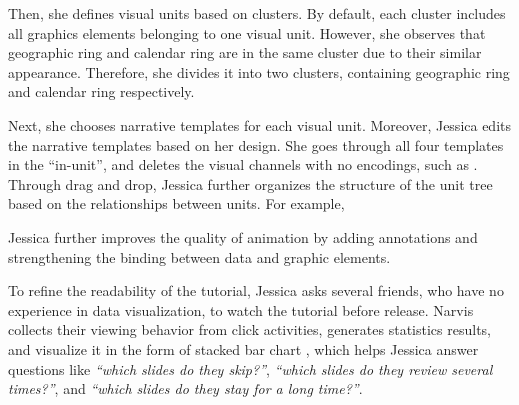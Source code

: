 Then, she defines visual units based on clusters. By default, each cluster includes all graphics elements belonging to one visual unit. However, she observes that geographic ring and calendar ring are in the same cluster due to their similar appearance. Therefore, she divides it into two clusters, containing geographic ring and calendar ring respectively.

Next, she chooses narrative templates for each visual unit. 
Moreover, Jessica edits the narrative templates based on her design. 
She goes through all four templates in the ``in-unit'', and deletes the visual channels with no encodings, such as . 
Through drag and drop, Jessica further organizes the structure of the unit tree based on the relationships between units. For example, 

Jessica further improves the quality of animation by adding annotations and strengthening the binding between data and graphic elements. 


To refine the readability of the tutorial, Jessica asks several friends, who have no experience in data visualization, to watch the tutorial before release. Narvis collects their viewing behavior from click activities, generates statistics results, and visualize it in the form of stacked bar chart , which helps Jessica answer questions like \textit{``which slides do they skip?''}, \textit{``which slides do they review several times?''}, and \textit{``which slides do they stay for a long time?''}.




